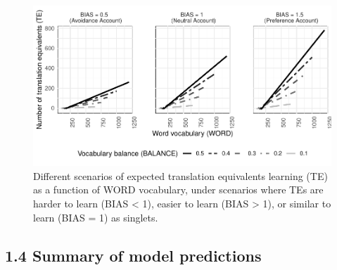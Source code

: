 \documentclass[
  english,
  ,man,floatsintext]{apa6}
\begin{document}
\begin{figure}[H]

{\centering \includegraphics[width=1\linewidth,height=0.8\textheight]{paper_TE_bilingual_vocabulary_model_files/figure-latex/fig3-1} 

}

\caption{Different scenarios of expected translation equivalents learning (TE) as a function of WORD vocabulary, under scenarios where TEs are harder to learn (BIAS < 1), easier to learn (BIAS > 1), or similar to learn (BIAS = 1) as singlets.}\label{fig:fig3}
\end{figure}

\hypertarget{summary-of-model-predictions}{%
\subsection{1.4 Summary of model predictions}\label{summary-of-model-predictions}}
\end{document}

